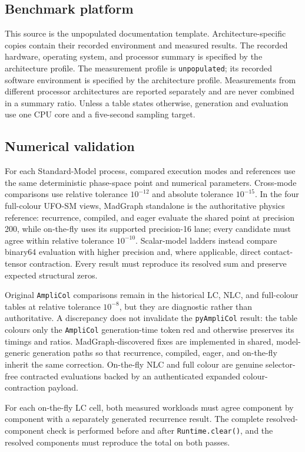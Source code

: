 \documentclass[10pt,letterpaper]{article}
\newcommand{\PAC}{\texttt{pyAmpliCol}}
\newcommand{\AC}{\texttt{AmpliCol}}
\newcommand{\ReportProfileName}{unpopulated}
\newcommand{\ReportPlatformSummary}{specified by the architecture profile}
\newcommand{\ReportToolchainSummary}{specified by the architecture profile}
\newcommand{\ReportEditionStatement}{This source is the unpopulated
  documentation template. Architecture-specific copies contain their recorded
  environment and measured results.}
\begin{document}
\subsection{Benchmark platform}

\ReportEditionStatement{} The recorded hardware, operating system, and processor
summary is \ReportPlatformSummary. The measurement profile is
\texttt{\ReportProfileName}; its recorded software environment is
\ReportToolchainSummary. Measurements from different processor architectures
are reported separately and are never combined in a summary ratio. Unless a
table states otherwise, generation and evaluation use one CPU core and a
five-second sampling target.

\subsection{Numerical validation}

For each Standard-Model process, compared execution modes and references use
the same deterministic phase-space point and numerical parameters. Cross-mode
comparisons use relative tolerance $10^{-12}$ and absolute tolerance
$10^{-15}$. In the four full-colour UFO-SM views, MadGraph standalone is the
authoritative physics reference: recurrence, compiled, and eager evaluate the
shared point at precision 200, while on-the-fly uses its supported precision-16
lane; every candidate must agree within relative tolerance $10^{-10}$. Scalar-model ladders
instead compare binary64 evaluation with higher precision and, where
applicable, direct contact-tensor contraction. Every result must reproduce its
resolved sum and preserve expected structural zeros.

Original \AC{} comparisons remain in the historical LC, NLC, and full-colour
tables at relative tolerance $10^{-8}$, but they are diagnostic rather than
authoritative. A discrepancy does not invalidate the \PAC{} result: the table
colours only the \AC{} generation-time token red and otherwise preserves its
timings and ratios. MadGraph-discovered fixes are implemented in shared,
model-generic generation paths so that recurrence, compiled, eager, and
on-the-fly inherit the same correction. On-the-fly NLC and full colour are
genuine selector-free contracted evaluations backed by an authenticated
expanded colour-contraction payload.

For each on-the-fly LC cell, both measured workloads must agree component by
component with a separately generated recurrence result. The complete
resolved-component check is performed before and after
\texttt{Runtime.clear()}, and the resolved components must reproduce the total
on both passes.
\end{document}
